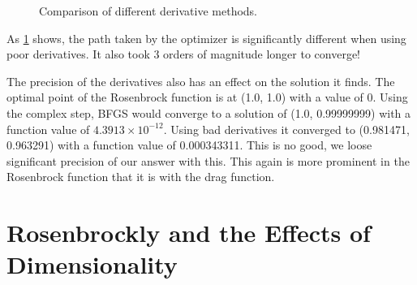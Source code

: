 \documentclass[12pt,parskip=full]{article}
\numberwithin{subsection}{section}
\begin{document}
\begin{figure}[!ht]
\begin{subfigure}[h]{0.4\textwidth}
			\end{subfigure}
			\caption{Comparison of different derivative methods.\label{fig:RoseConjGradDer}}
		\end{figure}
	
		As \cref{fig:RoseConjGradDer} shows, the path taken by the optimizer is significantly different when
		using poor derivatives. It also took 3 orders of magnitude longer to converge!
		
		The precision of the derivatives also has an effect on the solution it finds. The optimal point of
		the Rosenbrock function is at (1.0, 1.0) with a value of 0. Using the complex step, BFGS
		would converge to a solution of (1.0, 0.99999999) with a function value of $4.3913\times 10^{-12}$.
		Using bad derivatives it converged to (0.981471, 0.963291) with a function value of 0.000343311.
		This is no good, we loose significant precision of our answer with this. This again is more prominent
		in the Rosenbrock function that it is with the drag function.
		
	\pagebreak
	\section{Rosenbrockly and the Effects of Dimensionality}
	
\end{document}
